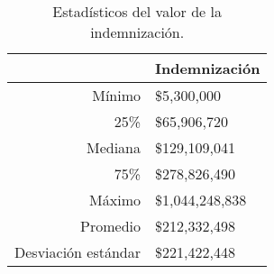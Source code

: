\begin{table}[!htbp]
\centering
\caption{Estadísticos del valor de la indemnización.} 
\label{tab:indemnizacion}
\begin{tabular}{rl}
  \hline
 & Indemnización \\ 
  \hline
Mínimo & \$5,300,000 \\ 
  25\% & \$65,906,720 \\ 
  Mediana & \$129,109,041 \\ 
  75\% & \$278,826,490 \\ 
  Máximo & \$1,044,248,838 \\ 
  Promedio & \$212,332,498 \\ 
  Desviación estándar & \$221,422,448 \\ 
   \hline
\end{tabular}
\end{table}
